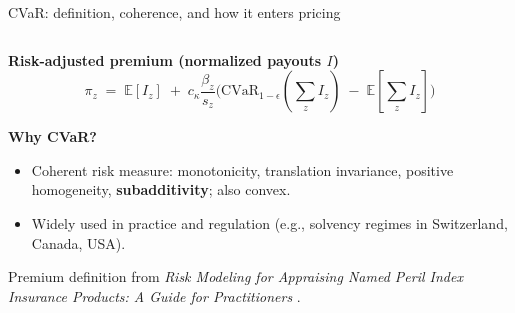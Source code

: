 \documentclass{beamer}
\begin{document}
\begin{frame}{CVaR: definition, coherence, and how it enters pricing}
\begin{minipage}[t][0.3\textheight][t]{\textwidth}
\begin{columns}[T,totalwidth=\textwidth]
      \end{columns}
      \end{minipage}
      
      \begin{minipage}[t][0.70\textheight][t]{\textwidth}
      \footnotesize
      \textbf{Risk-adjusted premium (normalized payouts \(I\))}
      \[
      \pi_z \;=\; \mathbb{E}[I_z] \;+\; c_\kappa \frac{\beta_z}{s_z}\Big(\mathrm{CVaR}_{1-\epsilon}(\sum_z I_z)\;-\;\mathbb{E}[\sum_z I_z]\Big)
      \]
      
      \textbf{Why CVaR?}
      \begin{itemize}
        \item Coherent risk measure: monotonicity, translation invariance, positive homogeneity, \textbf{subadditivity}; also convex.
        \item Widely used in practice and regulation (e.g., solvency regimes in Switzerland, Canada, USA).
      \end{itemize}
      
      {\scriptsize Premium definition from \textit{Risk Modeling for Appraising Named Peril Index Insurance Products: A Guide for Practitioners} \cite{mapfumo2017risk}.}
      \end{minipage}
      
      \end{frame}
\end{document}
